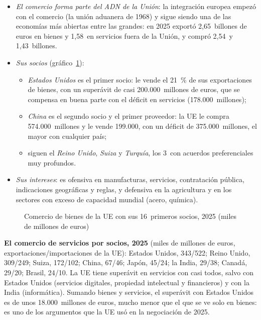 \documentclass[11pt]{article}
\begin{document}
\begin{itemize}
\item \emph{El comercio forma parte del ADN de la Unión}: la integración europea empezó con el comercio (la unión aduanera de 1968) y sigue siendo una de las economías más abiertas entre las grandes: en 2025 exportó 2,65~billones de euros en bienes y 1,58~en servicios fuera de la Unión, y compró 2,54~y 1,43~billones\nocite{Eurostat2026Socios,Eurostat2026Servicios}.
\item \emph{Sus socios} (gráfico~\ref{fig:socios}):
  \begin{itemize}
  \item \emph{Estados Unidos} es el primer socio: le vende el 21~\% de sus exportaciones de bienes, con un superávit de casi 200.000~millones de euros, que se compensa en buena parte con el déficit en servicios (178.000~millones)\nocite{Eurostat2026Servicios};
  \item \emph{China} es el segundo socio y el primer proveedor: la UE le compra 574.000~millones y le vende 199.000, con un déficit de 375.000~millones, el mayor con cualquier país\nocite{Eurostat2026Socios};
  \item siguen el \emph{Reino Unido}, \emph{Suiza} y \emph{Turquía}, los 3~con acuerdos preferenciales muy profundos.
  \end{itemize}
\item \emph{Sus intereses}: es ofensiva en manufacturas, servicios, contratación pública, indicaciones geográficas y reglas, y defensiva en la agricultura y en los sectores con exceso de capacidad mundial (acero, química).
\end{itemize}

\begin{figure}[H]
\centering
\caption{Comercio de bienes de la UE con sus 16~primeros socios, 2025 (miles de millones de euros)}\label{fig:socios}
\end{figure}

\begin{anotaciones}
\textbf{El comercio de servicios por socios, 2025} (miles de millones de euros, exportaciones/importaciones de la UE)\nocite{Eurostat2026Servicios}: Estados Unidos, 343/522; Reino Unido, 309/249; Suiza, 172/102; China, 67/46; Japón, 45/24; la India, 29/38; Canadá, 29/20; Brasil, 24/10. La UE tiene superávit en servicios con casi todos, salvo con Estados Unidos (servicios digitales, propiedad intelectual y financieros) y con la India (informática). Sumando bienes y servicios, el superávit con Estados Unidos es de unos 18.000~millones de euros, mucho menor que el que se ve solo en bienes: es uno de los argumentos que la UE usó en la negociación de 2025.
\end{anotaciones}
\end{document}

